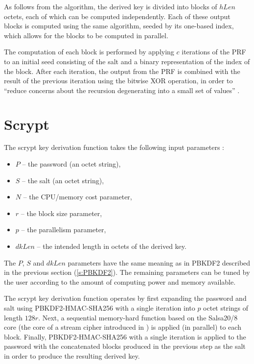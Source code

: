 \documentclass[12pt,oneside]{fithesis2}
\begin{document}
      As follows from the algorithm, the derived key is divided into blocks of $hLen$ octets, each of which can be computed independently. Each of these output blocks is computed using the same algorithm, seeded by its one-based index, which allows for the blocks to be computed in parallel.
      
      The computation of each block is performed by applying $c$ iterations of the PRF to an initial seed consisting of the salt and a binary representation of the index of the block. After each iteration, the output from the PRF is combined with the result of the previous iteration using the bitwise XOR operation, in order to ``reduce concerns about the recursion degenerating into a small set of values'' \cite[section 5.2]{rfc2898}.
      
      \section{Scrypt} \label{s:scrypt}
      The scrypt key derivation function takes the following input parameters \cite[chapter 7]{scrypt}:
      \begin{itemize}
        \item $P$ -- the password (an octet string),
        \item $S$ -- the salt (an octet string),
        \item $N$ -- the CPU/memory cost parameter,
        \item $r$ -- the block size parameter,
        \item $p$ -- the parallelism parameter,
        \item $dkLen$ -- the intended length in octets of the derived key.
      \end{itemize}
      
      The $P$, $S$ and $dkLen$ parameters have the same meaning as in PBKDF2 described in the previous section (\ref{s:PBKDF2}). The remaining parameters can be tuned by the user according to the amount of computing power and memory available.
      
      The scrypt key derivation function operates by first expanding the password and salt using PBKDF2-HMAC-SHA256 with a single iteration into $p$ octet strings of length $128r$. Next, a sequential memory-hard function based on the Salsa20/8 core (the core of a stream cipher introduced in \cite{salsa}) is applied (in parallel) to each block. Finally, PBKDF2-HMAC-SHA256 with a single iteration is applied to the password with the concatenated blocks produced in the previous step as the salt in order to produce the resulting derived key.
\end{document}
